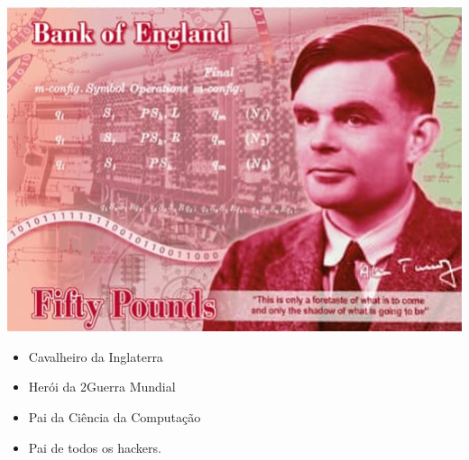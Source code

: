 

\begin{center}
	\includegraphics[width=.8\linewidth]{./IMG-GIT/turing-note.jpeg}
\end{center}

\vfill\null
\columnbreak

{\Large
	\begin{itemize}
		\item  Cavalheiro da Inglaterra
		\item Herói da 2\textordfeminine\space Guerra Mundial
		\item Pai da Ciência da Computação
		\item Pai de todos os hackers.
	\end{itemize}
}

\vfill\null
\columnbreak

